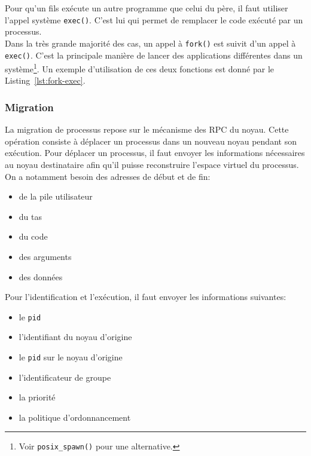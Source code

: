         Pour qu'un fils exécute un autre programme que celui du père, il faut
        utiliser l'appel système \texttt{exec()}. C'est lui qui permet de
        remplacer le code exécuté par un processus.\\

        Dans la très grande majorité des cas, un appel à \texttt{fork()} est
        suivit d'un appel à \texttt{exec()}. C'est la principale manière de
        lancer des applications différentes dans un système\footnote{Voir
          \texttt{posix\_spawn()} pour une alternative.}. Un exemple
          d'utilisation de ces deux fonctions est donné par le
          Listing~\ref{lst:fork-exec}.

         \FloatBarrier

      \subsubsection{Migration}

        La migration de processus repose sur le mécanisme des RPC du
        noyau. Cette opération consiste à déplacer un processus dans un nouveau
        noyau pendant son exécution. Pour déplacer un processus, il faut envoyer
        les informations nécessaires au noyau destinataire afin qu'il puisse
        reconstruire l'espace virtuel du processus. On a notamment besoin des
        adresses de début et de fin:
        \begin{itemize}
          \item de la pile utilisateur
          \item du tas
          \item du code
          \item des arguments
          \item des données
        \end{itemize}
        Pour l'identification et l'exécution, il faut envoyer les informations
        suivantes:
        \begin{itemize}
          \item le \texttt{pid}
          \item l'identifiant du noyau d'origine
          \item le \texttt{pid} sur le noyau d'origine
          \item l'identificateur de groupe
          \item la priorité
          \item la politique d'ordonnancement\\
        \end{itemize}

